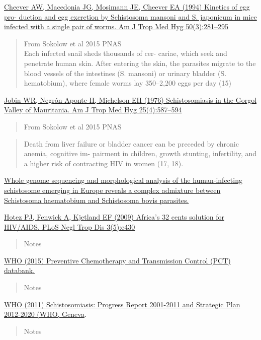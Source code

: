 \documentclass[10,portrait]{article}
\begin{document}
\href{}{Cheever AW, Macedonia JG, Mosimann JE, Cheever EA (1994)
Kinetics of egg pro- duction and egg excretion by Schistosoma mansoni
and S. japonicum in mice infected with a single pair of worms. Am J Trop
Med Hyg 50(3):281--295}

\begin{quote}
From Sokolow et al 2015 PNAS\\
Each infected snail sheds thousands of cer- cariae, which seek and
penetrate human skin. After entering the skin, the parasites migrate to
the blood vessels of the intestines (S. mansoni) or urinary bladder (S.
hematobium), where female worms lay 350--2,200 eggs per day (15)
\end{quote}

\href{}{Jobin WR, Negrón-Aponte H, Michelson EH (1976) Schistosomiasis
in the Gorgol Valley of Mauritania. Am J Trop Med Hyg 25(4):587--594}

\begin{quote}
From Sokolow et al 2015 PNAS
\end{quote}

\begin{quote}
Death from liver failure or bladder cancer can be preceded by chronic
anemia, cognitive im- pairment in children, growth stunting,
infertility, and a higher risk of contracting HIV in women (17, 18).
\end{quote}

\href{https://www.biorxiv.org/content/early/2018/08/11/387969}{Whole
genome sequencing and morphological analysis of the human-infecting
schistosome emerging in Europe reveals a complex admixture between
Schistosoma haematobium and Schistosoma bovis parasites.}

\href{}{Hotez PJ, Fenwick A, Kjetland EF (2009) Africa's 32 cents
solution for HIV/AIDS. PLoS Negl Trop Dis 3(5):e430}

\begin{quote}
Notes
\end{quote}

\href{www.who.int/neglected_diseases/preventive_chemotherapy/databank/}{WHO
(2015) Preventive Chemotherapy and Transmission Control (PCT) databank.}

\begin{quote}
Notes
\end{quote}

\href{}{WHO (2011) Schistosomiasis: Progress Report 2001-2011 and
Strategic Plan 2012-2020 (WHO, Geneva}.

\begin{quote}
Notes
\end{quote}
\end{document}
